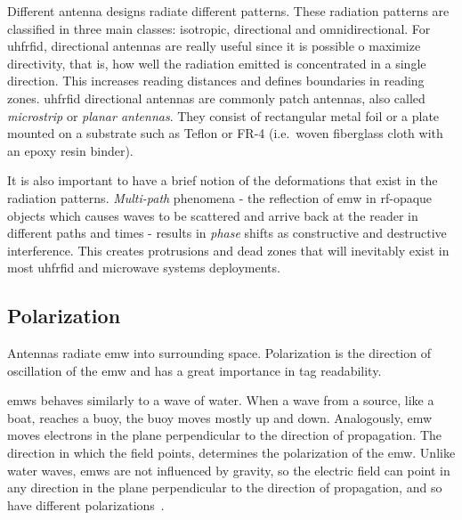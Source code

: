 Different antenna designs radiate different patterns. These radiation patterns are classified in three main classes: isotropic, directional and omnidirectional.
For \ac{uhfrfid}, directional antennas are really useful since it is possible o maximize directivity, that is, how well the radiation emitted is concentrated in a single direction. This increases reading distances and defines boundaries in reading zones. \ac{uhfrfid} directional antennas are commonly patch antennas, also called \emph{microstrip} or \emph{planar antennas}. They consist of rectangular metal foil or a plate mounted on a substrate such as Teflon or FR-4 (i.e.\ woven fiberglass cloth with an epoxy resin binder).

It is also important to have a brief notion of the deformations that exist in the radiation patterns.
\emph{Multi-path} phenomena - the reflection of \ac{emw} in \ac{rf}-opaque objects which causes waves to be scattered and arrive back at the reader in different paths and times - results in \emph{phase} shifts as constructive and destructive interference.
This creates protrusions and dead zones that will inevitably exist in most \ac{uhfrfid} and microwave systems deployments. 



\subsection{Polarization}

Antennas radiate \ac{emw} into surrounding space.
Polarization is the direction of oscillation of the \ac{emw} and has a great importance in tag readability.

\acp{emw} behaves similarly to a wave of water. When a wave from a source, like a boat, reaches a buoy, the buoy moves mostly up and down.
Analogously, \ac{emw} moves electrons in the plane perpendicular to the direction of propagation. The direction in which the field points, determines the polarization of the \ac{emw}.
Unlike water waves, \acp{emw} are not influenced by gravity, so the electric field can point in any direction in the plane perpendicular to the direction of propagation, and so have different polarizations~\cite{dobkinRFRFIDSecond2012}.

